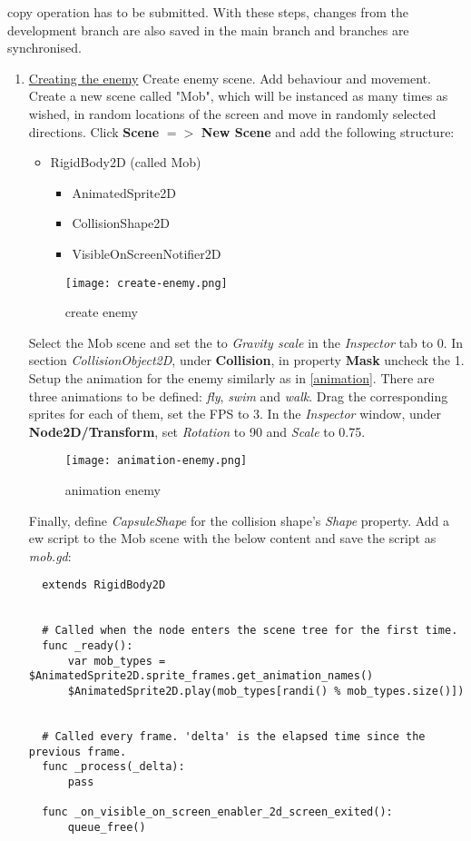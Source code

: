 copy operation has to be submitted. With these steps, changes from the development branch are also saved in the main branch
and branches are synchronised.
\begin{enumerate}[resume]
  \item \href{https://docs.godotengine.org/en/stable/getting_started/first_2d_game/04.creating_the_enemy.html}{\color{blue}Creating the enemy}
  Create enemy scene. Add behaviour and movement.
  Create a new scene called "Mob", which will be instanced as many times as wished, in random locations of the screen and 
  move in randomly selected directions. Click \textbf{Scene} {$=>$} \textbf{New Scene} and add the following structure:
  \begin{itemize}
    \item RigidBody2D (called Mob)
      \begin{itemize}
        \item AnimatedSprite2D
        \item CollisionShape2D
        \item VisibleOnScreenNotifier2D
      \end{itemize}
  \end{itemize}
  \begin{figure}[H]
    \centering
    \texttt{[image: create-enemy.png]}
      \caption{create enemy}
      \label{fig:create-enemy}
\end{figure}
Select the Mob scene and set the to \textit{Gravity scale} in the \textit{Inspector} tab to 0. 
In section \textit{CollisionObject2D}, under \textbf{Collision}, in property \textbf{Mask} uncheck the 1.
Setup the animation for the enemy similarly as in \ref{animation}. There are three animations to be defined:
\textit{fly}, \textit{swim} and \textit{walk}. Drag the corresponding sprites for each of them, set the FPS to 3.
In the \textit{Inspector} window, under \textbf{Node2D/Transform}, set \textit{Rotation} to 90 and \textit{Scale}
to 0.75.
\begin{figure}[H]
  \centering
  \texttt{[image: animation-enemy.png]}
    \caption{animation enemy}
    \label{fig:animation-enemy}
\end{figure}
Finally, define \textit{CapsuleShape} for the collision shape's \textit{Shape} property. Add a ew script to the Mob scene
with the below content and save the script as \textit{mob.gd}:
\begin{verbatim}
  extends RigidBody2D


  # Called when the node enters the scene tree for the first time.
  func _ready():
	  var mob_types = $AnimatedSprite2D.sprite_frames.get_animation_names()
	  $AnimatedSprite2D.play(mob_types[randi() % mob_types.size()])


  # Called every frame. 'delta' is the elapsed time since the previous frame.
  func _process(_delta):
	  pass

  func _on_visible_on_screen_enabler_2d_screen_exited():
	  queue_free()
\end{verbatim}
\end{enumerate}
